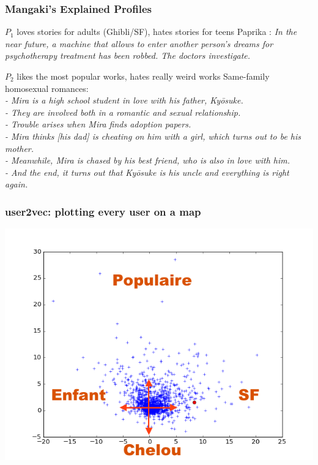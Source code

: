 \documentclass[handout]{beamer}
\begin{document}
\begin{frame}
    \frametitle{Mangaki's Explained Profiles}
    \begin{block}{$P_1$ loves stories for adults (Ghibli/SF), hates stories for teens}
    Paprika : {\em In the near future, a machine that allows to enter another person's dreams for psychotherapy treatment has been robbed. The doctors investigate.}
    \end{block}
    \pause
    \begin{block}{$P_2$ likes the most popular works, hates really weird works}
    Same-family homosexual romances:\\\pause
    \em \small - Mira is a high school student in love with his father, Ky\=osuke.\\\pause
    - They are involved both in a romantic and sexual relationship.\\\pause
    - Trouble arises when Mira finds adoption papers.\\\pause
    - Mira thinks [his dad] is cheating on him with a girl, which turns out to be his mother.\\\pause
    - Meanwhile, Mira is chased by his best friend, who is also in love with him.\\\pause
    - And the end, it turns out that Ky\=osuke is his uncle and everything is right again.
    \end{block}
\end{frame}

\begin{frame}
	\frametitle{user2vec: plotting every user on a map}
	\includegraphics[width=\linewidth]{figures/map.png}
\end{frame}
\end{document}
